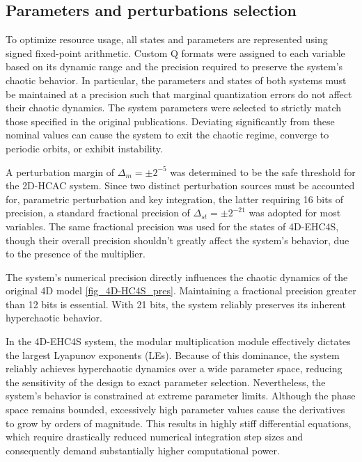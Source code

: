 \documentclass[preprint, 12pt, sort&compress]{elsarticle}
\begin{document}
{\color{red}
\subsection{Parameters and perturbations selection}\label{par_and_per}
To optimize resource usage, all states and parameters are represented using signed fixed-point arithmetic. Custom Q formats were assigned to each variable based on its dynamic range and the precision required to preserve the system's chaotic behavior. In particular, the parameters and states of both systems must be maintained at a precision such that marginal quantization errors do not affect their chaotic dynamics. The system parameters were selected to strictly match those specified in the original publications. Deviating significantly from these nominal values can cause the system to exit the chaotic regime, converge to periodic orbits, or exhibit instability.

A perturbation margin of $\Delta_m=\pm2^{-5}$ was determined to be the safe threshold for the 2D-HCAC system. Since two distinct perturbation sources must be accounted for, parametric perturbation and key integration, the latter requiring 16 bits of precision, a standard fractional precision of $\Delta_{st}=\pm2^{-21}$ was adopted for most variables. The same fractional precision was used for the states of 4D-EHC4S, though their overall precision shouldn't greatly affect the system's behavior, due to the presence of the multiplier.

The system’s numerical precision directly influences the chaotic dynamics of the original 4D model \ref{fig_4D-HC4S_pres}. Maintaining a fractional precision greater than 12 bits is essential. With 21 bits, the system reliably preserves its inherent hyperchaotic behavior.

In the 4D-EHC4S system, the modular multiplication module effectively dictates the largest Lyapunov exponents (LEs). Because of this dominance, the system reliably achieves hyperchaotic dynamics over a wide parameter space, reducing the sensitivity of the design to exact parameter selection. Nevertheless, the system's behavior is constrained at extreme parameter limits. Although the phase space remains bounded, excessively high parameter values cause the derivatives to grow by orders of magnitude. This results in highly stiff differential equations, which require drastically reduced numerical integration step sizes and consequently demand substantially higher computational power.

}
\end{document}
